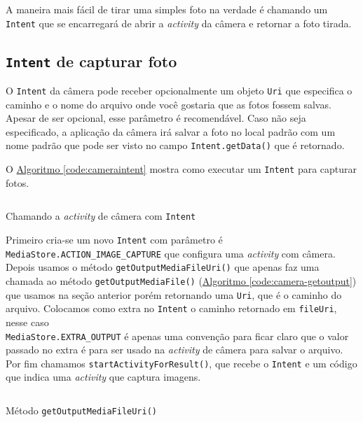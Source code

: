 \documentclass[a4paper,12pt,brazil,oneside]{book}
\begin{document}
\begin{singlespace}
		A maneira mais fácil de tirar uma simples foto na verdade é chamando um \texttt{Intent} que se encarregará de abrir a \emph{activity} da câmera e retornar a foto tirada.

	\subsection{\texttt{Intent} de capturar foto}
		
		O \texttt{Intent} da câmera pode receber opcionalmente um objeto \texttt{Uri} que especifica o caminho e o nome do arquivo onde você gostaria que as fotos fossem salvas. Apesar de ser opcional, esse parâmetro é recomendável. Caso não seja especificado, a aplicação da câmera irá salvar a foto no local padrão com um nome padrão que pode ser visto no campo \texttt{Intent.getData()} que é retornado.

		O \hyperref[code:cameraintent]{Algoritmo \ref*{code:cameraintent}} mostra como executar um \texttt{Intent} para capturar fotos.

		\begin{listing}[H]
		\inputminted[linenos=true,fontsize=\small,frame=lines, framesep=2mm, tabsize=2,numbersep=5pt]{java}{src/api/camera/captureintent.java}
		\caption{Chamando a \emph{activity} de câmera com \texttt{Intent}}
		\label{code:cameraintent}
		\end{listing} 		

		Primeiro cria-se um novo \texttt{Intent} com parâmetro é \texttt{MediaStore.ACTION\_IMAGE\_CAPTURE} que configura uma \emph{activity} com câmera. Depois usamos o método \texttt{getOutputMediaFileUri()} que apenas faz uma chamada ao método \texttt{getOutputMediaFile()} (\hyperref[code:camera-getoutput]{Algoritmo \ref*{code:camera-getoutput}}) que usamos na seção anterior porém retornando uma \texttt{Uri}, que é o caminho do arquivo. Colocamos como extra no \texttt{Intent} o caminho retornado em \texttt{fileUri}, nesse caso \\ \texttt{MediaStore.EXTRA\_OUTPUT} é apenas uma convenção para ficar claro que o valor passado no extra é para ser usado na \emph{activity} de câmera para salvar o arquivo. Por fim chamamos \texttt{startActivityForResult()}, que recebe o \texttt{Intent} e um código que indica uma \emph{activity} que captura imagens.

		\begin{listing}[H]
		\inputminted[linenos=true,fontsize=\small,frame=lines, framesep=2mm, tabsize=2,numbersep=5pt]{java}{src/api/camera/urifromfile.java}
		\caption{Método \texttt{getOutputMediaFileUri()}}
		\label{code:urifromfile}
		\end{listing} 		


\end{singlespace}
\end{document}
